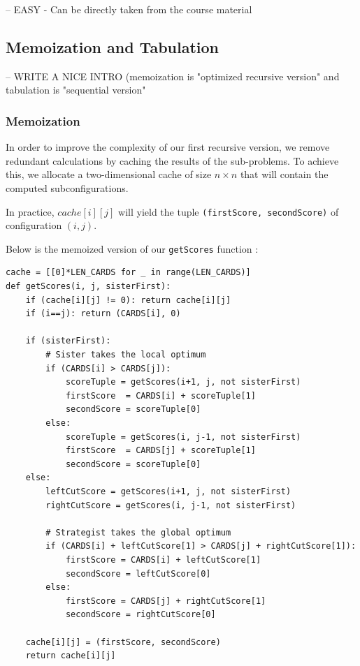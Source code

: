 \documentclass[a4paper,12pt,fleqn]{article}
\newcommand\ezskip{\medskip\noindent}
\begin{document}
-- EASY - Can be directly taken from the course material

\newpage
\subsection{Memoization and Tabulation}
-- WRITE A NICE INTRO (memoization is "optimized recursive version" and tabulation is "sequential version"

\subsubsection{Memoization} \label{susub:memoization}

In order to improve the complexity of our first recursive version, we remove redundant calculations by caching the results of the sub-problems. To achieve this, we allocate a two-dimensional cache of size $n \times n$ that will contain the computed subconfigurations.

In practice, $cache[i][j]$ will yield the tuple \texttt{(firstScore, secondScore)} of configuration $(i,j)$.

\ezskip
Below is the memoized version of our \texttt{getScores} function :

\begin{verbatim}
cache = [[0]*LEN_CARDS for _ in range(LEN_CARDS)]
def getScores(i, j, sisterFirst):
    if (cache[i][j] != 0): return cache[i][j]
    if (i==j): return (CARDS[i], 0)

    if (sisterFirst):
        # Sister takes the local optimum
        if (CARDS[i] > CARDS[j]):
            scoreTuple = getScores(i+1, j, not sisterFirst)
            firstScore  = CARDS[i] + scoreTuple[1]
            secondScore = scoreTuple[0]
        else:
            scoreTuple = getScores(i, j-1, not sisterFirst)
            firstScore  = CARDS[j] + scoreTuple[1]
            secondScore = scoreTuple[0]
    else:
        leftCutScore = getScores(i+1, j, not sisterFirst)
        rightCutScore = getScores(i, j-1, not sisterFirst)

        # Strategist takes the global optimum
        if (CARDS[i] + leftCutScore[1] > CARDS[j] + rightCutScore[1]):
            firstScore = CARDS[i] + leftCutScore[1]
            secondScore = leftCutScore[0]
        else:
            firstScore = CARDS[j] + rightCutScore[1]
            secondScore = rightCutScore[0]
    
    cache[i][j] = (firstScore, secondScore)
    return cache[i][j]
\end{verbatim}
\end{document}
